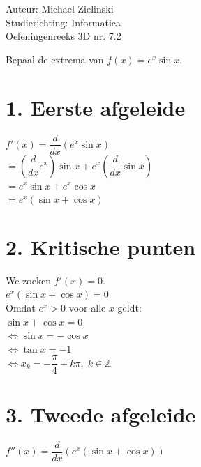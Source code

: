 \documentclass[a4paper]{article}
\begin{document}
\noindent \large Auteur: Michael Zielinski \\
\noindent \large Studierichting: Informatica\\
\noindent \large Oefeningenreeks 3D nr. 7.2 \\

\normalsize

Bepaal de extrema van $f(x)=e^x\sin x$. \\

\section*{1. Eerste afgeleide}

$f'(x)=\dfrac{d}{dx}(e^x\sin x)$ \\

$=\left(\dfrac{d}{dx}e^x\right)\sin x
+ e^x\left(\dfrac{d}{dx}\sin x\right)$ \\

$=e^x\sin x + e^x\cos x$ \\

$=e^x\left(\sin x+\cos x\right)$ \\

\section*{2. Kritische punten}

We zoeken $f'(x)=0$. \\

$e^x\left(\sin x+\cos x\right)=0$ \\

Omdat $e^x>0$ voor alle $x$ geldt: \\

$\sin x+\cos x=0$ \\

$\Leftrightarrow\sin x=-\cos x$ \\

$\Leftrightarrow\tan x=-1$ \\

$\Leftrightarrow x_k=-\dfrac{\pi}{4}+k\pi,\;k\in\mathbb{Z}$ \\

\section*{3. Tweede afgeleide}

$f''(x)=\dfrac{d}{dx}\left(e^x(\sin x+\cos x)\right)$ \\
\end{document}
